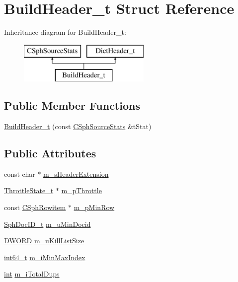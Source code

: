 \hypertarget{structBuildHeader__t}{\section{Build\-Header\-\_\-t Struct Reference}
\label{structBuildHeader__t}
}
Inheritance diagram for Build\-Header\-\_\-t\-:\begin{figure}[H]
\begin{center}
\leavevmode
\includegraphics[height=2.000000cm]{structBuildHeader__t}
\end{center}
\end{figure}
\subsection*{Public Member Functions}
\begin{DoxyCompactItemize}
\item 
\hyperlink{structBuildHeader__t_a3ace000051faa22bd88c0a6fa5b5b5dc}{Build\-Header\-\_\-t} (const \hyperlink{structCSphSourceStats}{C\-Sph\-Source\-Stats} \&t\-Stat)
\end{DoxyCompactItemize}
\subsection*{Public Attributes}
\begin{DoxyCompactItemize}
\item 
const char $\ast$ \hyperlink{structBuildHeader__t_a80651479560648edccc7ac74f48ae3de}{m\-\_\-s\-Header\-Extension}
\item 
\hyperlink{structThrottleState__t}{Throttle\-State\-\_\-t} $\ast$ \hyperlink{structBuildHeader__t_abea935c8fd6e25d76bec5d8d2fce2ac9}{m\-\_\-p\-Throttle}
\item 
const \hyperlink{sphinx_8h_a6a2df0f05f3397df8b6e230fda6f852f}{C\-Sph\-Rowitem} $\ast$ \hyperlink{structBuildHeader__t_a170ef51d4ac021e3f101654529064d08}{m\-\_\-p\-Min\-Row}
\item 
\hyperlink{sphinx_8h_a3176771631c12a9e4897272003e6b447}{Sph\-Doc\-I\-D\-\_\-t} \hyperlink{structBuildHeader__t_a79ae5094fceb731033d83c6a8613715b}{m\-\_\-u\-Min\-Docid}
\item 
\hyperlink{sphinxstd_8h_a798af1e30bc65f319c1a246cecf59e39}{D\-W\-O\-R\-D} \hyperlink{structBuildHeader__t_a537c06b57103c7d52f2c0f5096b6170b}{m\-\_\-u\-Kill\-List\-Size}
\item 
\hyperlink{sphinxstd_8h_a996e72f71b11a5bb8b3b7b6936b1516d}{int64\-\_\-t} \hyperlink{structBuildHeader__t_a2d353f7e911f1f663fb06299c05f26eb}{m\-\_\-i\-Min\-Max\-Index}
\item 
\hyperlink{sphinxexpr_8cpp_a4a26e8f9cb8b736e0c4cbf4d16de985e}{int} \hyperlink{structBuildHeader__t_a0f3af6b2ee921651242450b275dea9ed}{m\-\_\-i\-Total\-Dups}
\end{DoxyCompactItemize}


